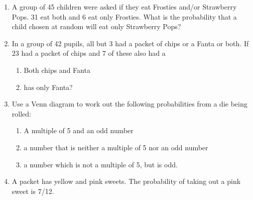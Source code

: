             \label{m39373*id115876}\begin{enumerate}[noitemsep, label=\textbf{\arabic*}. ] 
            \label{m39373*uid104}\item A group of 45 children were asked if they eat Frosties and/or
Strawberry Pops. 31 eat both and 6 eat only Frosties. What is the probability
that a child chosen at random will eat only Strawberry Pops?\newline
\label{m39373*uid105}\item In a group of 42 pupils, all but 3 had a packet of
chips or a Fanta or both. If 23 had a packet of chips and 7 of these also had a
%     
\label{m39373*id115906}\begin{enumerate}[noitemsep, label=\textbf{\alph*}. ] 
            \label{m39373*uid106}\item Both chips and Fanta
\label{m39373*uid107}\item has only Fanta?
\end{enumerate}
                \label{m39373*uid108}\item Use a Venn diagram to work out the following
probabilities from a die being rolled:
\label{m39373*id115948}\begin{enumerate}[noitemsep, label=\textbf{\alph*}. ] 
            \label{m39373*uid109}\item A multiple of 5 and an odd number
\label{m39373*uid110}\item a number that is neither a multiple of 5 nor an odd
number
\label{m39373*uid111}\item a number which is not a multiple of 5, but is odd.
\end{enumerate}
                \label{m39373*uid112}\item A packet has yellow and pink sweets. The probability
of taking out a pink sweet is 7/12.
\label{m39373*id116002}\begin{enumerate}[noitemsep, label=\textbf{\alph*}. ] 

\end{enumerate}
\end{enumerate}
